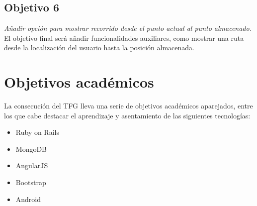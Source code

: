 \subsection{Objetivo 6}
\emph{Añadir opción para mostrar recorrido desde el punto actual al punto almacenado.}\\
El objetivo final será añadir funcionalidades auxiliares, como mostrar una ruta desde la localización del usuario hasta la posición almacenada.

\section{Objetivos académicos}
La consecución del \ac{TFG} lleva una serie de objetivos académicos aparejados, entre los que cabe destacar el aprendizaje y asentamiento de las siguientes tecnologías:

\begin{itemize}[label={$\bullet$},labelindent=\parindent,leftmargin=2cm]
	\item Ruby on Rails
	\item MongoDB
	\item AngularJS
	\item Bootstrap
	\item Android
\end{itemize}

